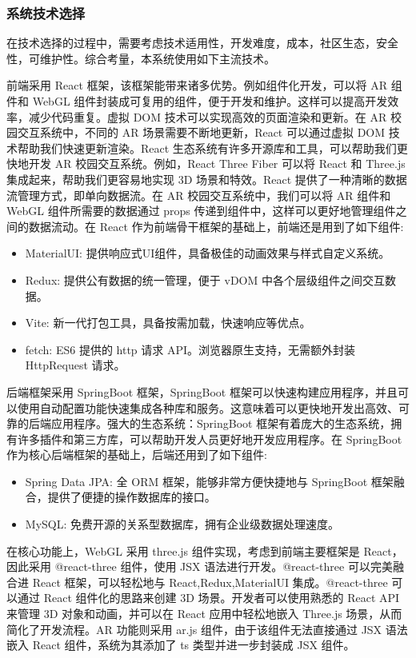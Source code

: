 \subsubsection{系统技术选择}

在技术选择的过程中，需要考虑技术适用性，开发难度，成本，社区生态，安全性，可维护性。综合考量，本系统使用如下主流技术。

前端采用 React 框架，该框架能带来诸多优势。例如组件化开发，可以将 AR 组件和 WebGL 组件封装成可复用的组件，便于开发和维护。这样可以提高开发效率，减少代码重复。虚拟 DOM 技术可以实现高效的页面渲染和更新。在 AR 校园交互系统中，不同的 AR 场景需要不断地更新，React 可以通过虚拟 DOM 技术帮助我们快速更新渲染。React 生态系统有许多开源库和工具，可以帮助我们更快地开发 AR 校园交互系统。例如，React Three Fiber 可以将 React 和 Three.js 集成起来，帮助我们更容易地实现 3D 场景和特效。React 提供了一种清晰的数据流管理方式，即单向数据流。在 AR 校园交互系统中，我们可以将 AR 组件和 WebGL 组件所需要的数据通过 props 传递到组件中，这样可以更好地管理组件之间的数据流动。在 React 作为前端骨干框架的基础上，前端还是用到了如下组件:
\begin{itemize}
  \item MaterialUI: 提供响应式UI组件，具备极佳的动画效果与样式自定义系统。
  \item Redux: 提供公有数据的统一管理，便于 vDOM 中各个层级组件之间交互数据。
  \item Vite: 新一代打包工具，具备按需加载，快速响应等优点。
  \item fetch: ES6 提供的 http 请求 API。浏览器原生支持，无需额外封装 HttpRequest 请求。
\end{itemize}

后端框架采用 SpringBoot 框架，SpringBoot 框架可以快速构建应用程序，并且可以使用自动配置功能快速集成各种库和服务。这意味着可以更快地开发出高效、可靠的后端应用程序。强大的生态系统：SpringBoot 框架有着庞大的生态系统，拥有许多插件和第三方库，可以帮助开发人员更好地开发应用程序。在 SpringBoot 作为核心后端框架的基础上，后端还用到了如下组件:
\begin{itemize}
  \item Spring Data JPA: 全 ORM 框架，能够非常方便快捷地与 SpringBoot 框架融合，提供了便捷的操作数据库的接口。
  \item MySQL: 免费开源的关系型数据库，拥有企业级数据处理速度。
\end{itemize}

在核心功能上，WebGL 采用 three.js 组件实现，考虑到前端主要框架是 React，因此采用 @react-three 组件，使用 JSX 语法进行开发。@react-three 可以完美融合进 React 框架，可以轻松地与 React,Redux,MaterialUI 集成。@react-three 可以通过 React 组件化的思路来创建 3D 场景。开发者可以使用熟悉的 React API 来管理 3D 对象和动画，并可以在 React 应用中轻松地嵌入 Three.js 场景，从而简化了开发流程。AR 功能则采用 ar.js 组件，由于该组件无法直接通过 JSX 语法嵌入 React 组件，系统为其添加了 ts 类型并进一步封装成 JSX 组件。

